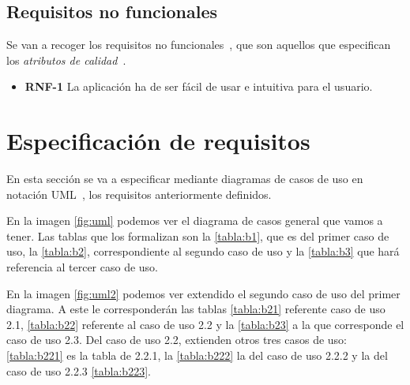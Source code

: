 \subsection{Requisitos no funcionales}
Se van a recoger los requisitos no funcionales~\cite{nofun}, que son aquellos que especifican los \textit{atributos de calidad}~\cite{atributo}.

\begin{itemize}
	\item \textbf{RNF-1} La aplicación ha de ser fácil de usar e intuitiva para el usuario.
\end{itemize}
\section{Especificación de requisitos}

En esta sección se va a especificar mediante diagramas de casos de uso en notación UML~\cite{uml}, los requisitos anteriormente definidos.

En la imagen \ref{fig:uml} podemos ver el diagrama de casos general que vamos a tener. Las tablas que los formalizan son la \ref{tabla:b1}, que es del primer caso de uso, la \ref{tabla:b2}, correspondiente al segundo caso de uso  y la \ref{tabla:b3} que hará referencia al tercer caso de uso.

 En la imagen \ref{fig:uml2} podemos ver extendido el segundo caso de uso del primer diagrama. A este le corresponderán las tablas \ref{tabla:b21} referente caso de uso 2.1, \ref{tabla:b22} referente al caso de uso 2.2 y la \ref{tabla:b23} a la que corresponde el caso de uso 2.3.
 Del caso de uso 2.2, extienden otros tres casos de uso: \ref{tabla:b221} es la tabla de 2.2.1, la \ref{tabla:b222} la del caso de uso 2.2.2 y la del caso de uso 2.2.3 \ref{tabla:b223}.








